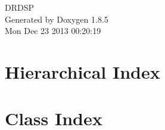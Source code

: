 \documentclass[twoside]{book}
\newcommand{\clearemptydoublepage}{%
  \newpage{\pagestyle{empty}\cleardoublepage}%
}
\begin{document}
\hypersetup{pageanchor=false}
\begin{titlepage}
\vspace*{7cm}
\begin{center}%
{\Large D\-R\-D\-S\-P }\\
\vspace*{1cm}
{\large Generated by Doxygen 1.8.5}\\
\vspace*{0.5cm}
{\small Mon Dec 23 2013 00:20:19}\\
\end{center}
\end{titlepage}
\clearemptydoublepage
\tableofcontents
\clearemptydoublepage
{}
\hypersetup{pageanchor=true}

\chapter{Hierarchical Index}

\chapter{Class Index}

\end{document}

